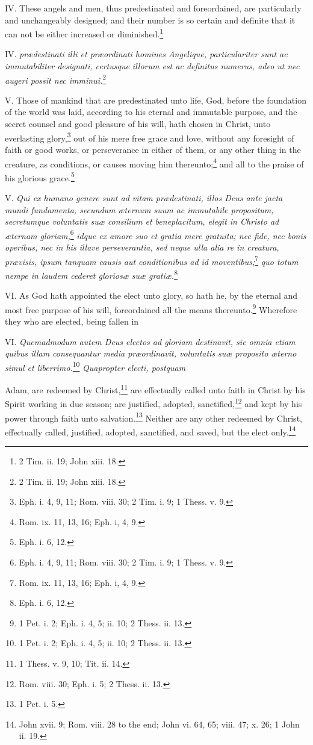IV. These angels and men, thus predestinated and foreordained, are particularly and unchangeably designed; and their number is so certain and definite that it can not be either increased or diminished.\footnote{2 Tim. ii. 19; John xiii. 18.}

IV. \emph{prædestinati illi et præordinati homines Angelique, particulariter sunt ac immutabiliter designati, certusque illorum est ac definitus numerus, adeo ut nec augeri possit nec imminui.}\footnote{2 Tim. ii. 19; John xiii. 18.}

V. Those of mankind that are predestinated unto life, God, before the foundation of the world was laid, according to his eternal and immutable purpose, and the secret counsel and good pleasure of his will, hath chosen in Christ, unto everlasting glory,\footnote{Eph. i. 4, 9, 11; Rom. viii. 30; 2 Tim. i. 9; 1 Thess. v. 9.} out of his mere free grace and love, without any foresight of faith or good works, or perseverance in either of them, or any other thing in the creature, as conditions, or causes moving him thereunto;\footnote{Rom. ix. 11, 13, 16; Eph. i, 4, 9.} and all to the praise of his glorious grace.\footnote{Eph. i. 6, 12.}

V. \emph{Qui ex humano genere sunt ad vitam prædestinati, illos Deus ante jacta mundi fundamenta, secundum æternum suum ac immutabile propositum, secretumque voluntatis suæ consilium et beneplacitum, elegit in Christo ad æternam gloriam,}\footnote{Eph. i. 4, 9, 11; Rom. viii. 30; 2 Tim. i. 9; 1 Thess. v. 9.}\emph{ idque ex amore suo et gratia mere gratuita; nec fide, nec bonis operibus, nec in his illave perseverantia, sed neque ulla alia re in creatura, prævisis, ipsum tanquam causis aut conditionibus ad id moventibus;}\footnote{Rom. ix. 11, 13, 16; Eph. i, 4, 9.}\emph{ quo totum nempe in laudem cederet gloriosæ suæ gratiæ.}\footnote{Eph. i. 6, 12.}

VI. As God hath appointed the elect unto glory, so hath he, by the eternal and most free purpose of his will, foreordained all the means thereunto.\footnote{1 Pet. i. 2;  Eph. i. 4, 5; ii. 10;  2 Thess. ii. 13.} Wherefore they who are elected, being fallen in

VI. \emph{Quemadmodum autem Deus electos ad gloriam destinavit, sic omnia etiam quibus illam consequantur media præordinavit, voluntatis suæ proposito æterno simul et liberrimo.}\footnote{1 Pet. i. 2; Eph. i. 4, 5;  ii. 10; 2 Thess. ii. 13.}\emph{ Quapropter electi, postquam }

Adam, are redeemed by Christ,\footnote{1 Thess. v. 9, 10; Tit. ii. 14.} are effectually called unto faith in Christ by his Spirit working in due season; are justified, adopted, sanctified,\footnote{Rom. viii. 30; Eph. i. 5; 2 Thess. ii. 13.} and kept by his power through faith unto salvation.\footnote{1 Pet. i. 5.} Neither are any other redeemed by Christ, effectually called, justified, adopted, sanctified, and saved, but the elect only.\footnote{John xvii. 9; Rom. viii. 28 to the end; John vi. 64, 65; viii. 47; x. 26; 1 John ii. 19.}

